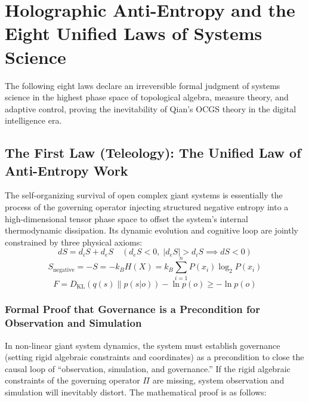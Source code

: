 \documentclass{article}
\begin{document}
\section{Holographic Anti-Entropy and the Eight Unified Laws of Systems Science}
\label{laws}

The following eight laws declare an irreversible formal judgment of systems science in the highest phase space of topological algebra, measure theory, and adaptive control, proving the inevitability of Qian's OCGS theory in the digital intelligence era.

\subsection*{The First Law (Teleology): The Unified Law of Anti-Entropy Work}
The self-organizing survival of open complex giant systems is essentially the process of the governing operator injecting structured negative entropy into a high-dimensional tensor phase space to offset the system's internal thermodynamic dissipation. Its dynamic evolution and cognitive loop are jointly constrained by three physical axioms:
\begin{equation}
    dS = d_iS + d_eS \quad \left( d_eS < 0, \; |d_eS| > d_iS \implies dS < 0 \right)
\end{equation}
\begin{equation}
    S_{\text{negative}} = -S = -k_B H(X) = k_B \sum_{i=1}^{n} P(x_i) \log_2 P(x_i)
\end{equation}
\begin{equation}
    F = D_{\text{KL}}\left(q(s) \parallel p(s|o)\right) - \ln p(o) \ge -\ln p(o)
\end{equation}

\subsubsection*{Formal Proof that Governance is a Precondition for Observation and Simulation}
In non-linear giant system dynamics, the system must establish governance (setting rigid algebraic constraints and coordinates) as a precondition to close the causal loop of ``observation, simulation, and governance.'' If the rigid algebraic constraints of the governing operator $\Pi$ are missing, system observation and simulation will inevitably distort. The mathematical proof is as follows:
\end{document}

